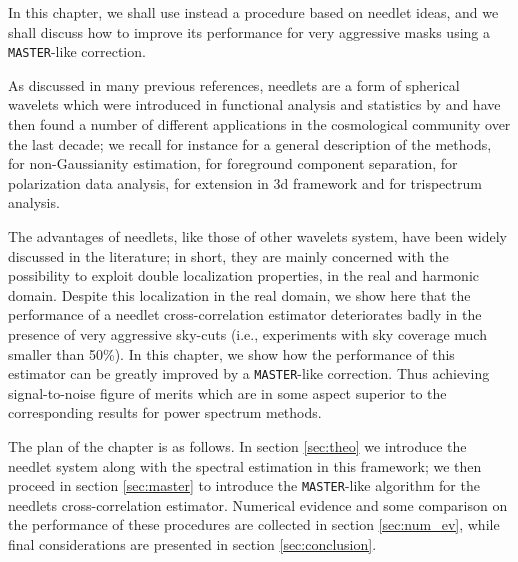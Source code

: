 In this chapter, we shall use instead a procedure based on needlet ideas, and we shall discuss how to 
improve its performance for very aggressive masks using a \texttt{MASTER}-like correction.

As discussed in many previous references, needlets are a form of spherical wavelets which were 
introduced in functional analysis and statistics by \cite{Narcowich2006,Baldi2009a} and have then found a 
number of different applications in the cosmological community over the last decade; we recall for 
instance \cite{Marinucci2007} for a general description of the methods, 
\cite{Lan2008,Rudjord2009a,Pietrobon2010a,Donzelli2012,Regan2015,Ade:2015ava} for non-Gaussianity 
estimation, \cite{Delabrouille2010,2014A&A...571A..12P,Adam:2015tpy,Rogers2016,Rogers2016a} for 
foreground component separation, \cite{Geller2008,Leistedt2015a,Ade:2015ava} for polarization data 
analysis, 
\cite{Durastanti2014,Leistedt2015} for extension in 3d framework and \cite{Troja2014,Regan2015} for 
trispectrum analysis.

The advantages of needlets, like those of other wavelets system, have been widely discussed in the 
literature; in short, they are mainly concerned with the possibility to exploit double localization properties, 
in the real and harmonic domain. Despite this localization in the real domain, we show here that the 
performance of a needlet cross-correlation estimator deteriorates badly in the presence of very aggressive 
sky-cuts (i.e., experiments with sky coverage much smaller than 50\%). In this chapter, we show how the 
performance of this estimator can be greatly improved by a \texttt{MASTER}-like correction. Thus achieving 
signal-to-noise figure of merits which are in some aspect superior to the corresponding results for power 
spectrum methods.

The plan of the chapter is as follows. In section \eqref{sec:theo} we introduce the needlet system along with the spectral estimation in this framework; we then proceed in section \eqref{sec:master} to 
introduce the \texttt{MASTER}-like algorithm for the needlets cross-correlation estimator. Numerical evidence and 
some comparison on the performance of these procedures are collected in section \eqref{sec:num_ev}, 
while final considerations are presented in section \eqref{sec:conclusion}.

